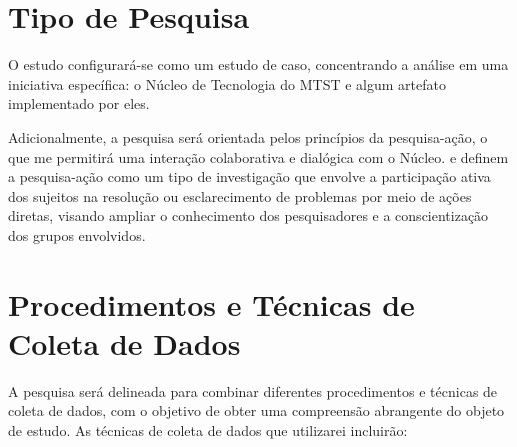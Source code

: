 \section{Tipo de Pesquisa}

O estudo configurará-se como um estudo de caso, concentrando a análise em uma iniciativa específica: o Núcleo de Tecnologia do MTST e algum artefato implementado por eles.

Adicionalmente, a pesquisa será orientada pelos princípios da pesquisa-ação, o que me permitirá uma interação colaborativa e dialógica com o Núcleo.  e  definem a pesquisa-ação como um tipo de investigação que envolve a participação ativa dos sujeitos na resolução ou esclarecimento de problemas por meio de ações diretas, visando ampliar o conhecimento dos pesquisadores e a conscientização dos grupos envolvidos.

\section{Procedimentos e Técnicas de Coleta de Dados}

A pesquisa será delineada para combinar diferentes procedimentos e técnicas de coleta de dados, com o objetivo de obter uma compreensão abrangente do objeto de estudo. As técnicas de coleta de dados que utilizarei incluirão:

